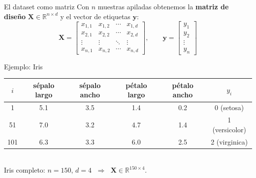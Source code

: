 \documentclass[10pt,aspectratio=169]{beamer}
\begin{document}
\begin{frame}{El dataset como matriz}
  Con $n$ muestras apiladas obtenemos la \textbf{matriz de diseño} $\mathbf{X}\in\mathbb{R}^{n\times d}$ y el vector de etiquetas $\mathbf{y}$:
  \[
    \mathbf{X} =
    \begin{bmatrix}
      x_{1,1} & x_{1,2} & \cdots & x_{1,d} \\
      x_{2,1} & x_{2,2} & \cdots & x_{2,d} \\
      \vdots  & \vdots  & \ddots & \vdots  \\
      x_{n,1} & x_{n,2} & \cdots & x_{n,d}
    \end{bmatrix},
    \qquad
    \mathbf{y} = \begin{bmatrix} y_1 \\ y_2 \\ \vdots \\ y_n \end{bmatrix}
  \]
  \begin{exampleblock}{Ejemplo: Iris}
    \centering\small
    \begin{tabular}{c cccc c}
      \toprule
      $i$ & sépalo largo & sépalo ancho & pétalo largo & pétalo ancho & $y_i$ \\
      \midrule
      1   & 5.1 & 3.5 & 1.4 & 0.2 & 0 (setosa) \\
      51  & 7.0 & 3.2 & 4.7 & 1.4 & 1 (versicolor) \\
      101 & 6.3 & 3.3 & 6.0 & 2.5 & 2 (virginica) \\
      \bottomrule
    \end{tabular}\\[0.3em]
    Iris completo: $n=150$, $d=4$ $\;\Rightarrow\;$ $\mathbf{X}\in\mathbb{R}^{150\times 4}$.
  \end{exampleblock}
\end{frame}
\end{document}
